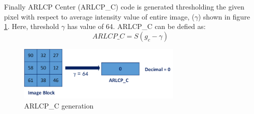 \documentclass[12pt]{article}
\begin{document}
Finally ARLCP Center (ARLCP\_C) code is generated thresholding the given pixel with respect to average intensity value of entire image, ($\gamma$) shown in figure \ref{fig:center}. Here, threshold $\gamma$ has value of 64. ARLCP\_C can be defied as:\\

\begin{equation}
 ARLCP\_C = S(g_c-\gamma)
 \label{equation:center}
\end{equation}
\vspace*{0.5cm}
\begin{figure}[H]
	\begin{center}
		\centering
		\includegraphics[width=0.7\textwidth]{center.png}
		\caption{ARLCP\_C generation}
		\label{fig:center}
	\end{center}
\end{figure}
\end{document}
